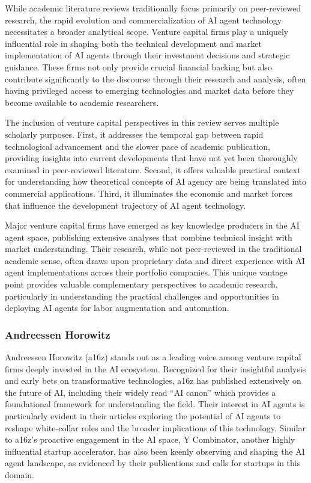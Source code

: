 \documentclass[
]{article}
\begin{document}
While academic literature reviews traditionally focus primarily on
peer-reviewed research, the rapid evolution and commercialization of AI
agent technology necessitates a broader analytical scope. Venture
capital firms play a uniquely influential role in shaping both the
technical development and market implementation of AI agents through
their investment decisions and strategic guidance. These firms not only
provide crucial financial backing but also contribute significantly to
the discourse through their research and analysis, often having
privileged access to emerging technologies and market data before they
become available to academic researchers.

The inclusion of venture capital perspectives in this review serves
multiple scholarly purposes. First, it addresses the temporal gap
between rapid technological advancement and the slower pace of academic
publication, providing insights into current developments that have not
yet been thoroughly examined in peer-reviewed literature. Second, it
offers valuable practical context for understanding how theoretical
concepts of AI agency are being translated into commercial applications.
Third, it illuminates the economic and market forces that influence the
development trajectory of AI agent technology.

Major venture capital firms have emerged as key knowledge producers in
the AI agent space, publishing extensive analyses that combine technical
insight with market understanding. Their research, while not
peer-reviewed in the traditional academic sense, often draws upon
proprietary data and direct experience with AI agent implementations
across their portfolio companies. This unique vantage point provides
valuable complementary perspectives to academic research, particularly
in understanding the practical challenges and opportunities in deploying
AI agents for labor augmentation and automation.

\subsubsection{Andreessen Horowitz}\label{andreessen-horowitz}

Andreessen Horowitz (a16z) stands out as a leading voice among venture
capital firms deeply invested in the AI ecosystem. Recognized for their
insightful analysis and early bets on transformative technologies, a16z
has published extensively on the future of AI, including their widely
read ``AI canon'' which provides a foundational framework for
understanding the field. Their interest in AI agents is particularly
evident in their articles exploring the potential of AI agents to
reshape white-collar roles and the broader implications of this
technology. Similar to a16z's proactive engagement in the AI space, Y
Combinator, another highly influential startup accelerator, has also
been keenly observing and shaping the AI agent landscape, as evidenced
by their publications and calls for startups in this domain.
\end{document}
